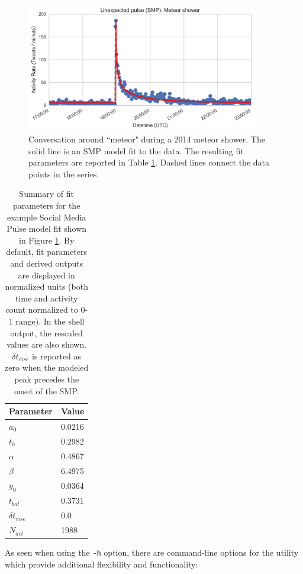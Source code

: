 \documentclass{article}
\begin{document}
\begin{figure}[!h]
\centering
\includegraphics[width=0.9\textwidth]{img/meteor-shower.png}
\caption{Conversation around ``meteor" during a 2014 meteor shower. The solid line is an SMP model fit to the data. The resulting fit parameters are reported in Table \ref{tab:unex-pulse}. Dashed lines connect the data points in the series.}
\label{fig:fit-pulse}
\end{figure}


\begin{table}[!h]   %
\centering
\begin{tabular}{ p{2cm} | p{2cm} }
\hline
Parameter       & Value     \tabularnewline     \hline
$a_0$           & 0.0216    \tabularnewline     \hline 
$t_0$           & 0.2982    \tabularnewline     \hline 
$\alpha$        & 0.4867    \tabularnewline     \hline 
$\beta$         & 6.4975    \tabularnewline     \hline 
$y_0$           & 0.0364    \tabularnewline     \hline 
\hline
$t_{bal}$       & 0.3731      \tabularnewline     \hline 
$\delta t_{rise}$   & 0.0     \tabularnewline     \hline 
$N_{act}$           & 1988    \tabularnewline     \hline 

\end{tabular}
\caption{Summary of fit parameters for the example Social Media Pulse model fit shown in Figure \ref{fig:fit-pulse}. By default, fit parameters and derived outputs are displayed in normalized units (both time and activity count normalized to 0-1 range). In the shell output, the rescaled values are also shown. $\delta t_{rise}$ is reported as zero when the modeled peak precedes the onset of the SMP.} 
\label{tab:unex-pulse}
\end{table}


As seen when using the \texttt{-h} option, there are command-line options for the utility which provide additional flexibility and functionality: 
\end{document}
